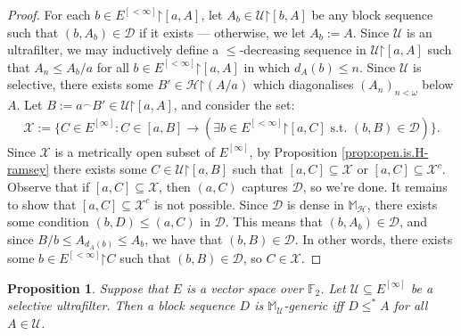 \documentclass[10pt,a4paper]{amsart}
\theoremstyle{plain}
\numberwithin{equation}{section}
\newtheorem{proposition}[theorem]{Proposition}
\theoremstyle{definition}
\newcommand{\cal}{\mathcal}
\newcommand{\restrictedto}{\mathord{\upharpoonright}}
\newcommand{\U}{\cal{U}}
\newcommand{\X}{\cal{X}}
\renewcommand{\H}{\cal{H}}
\newcommand{\D}{\cal{D}}
\begin{document}
\begin{proof}
    For each $b \in E^{[<\infty]}\restrictedto[a,A]$, let $A_b \in \U\restrictedto[b,A]$ be any block sequence such that $(b,A_b)\in \D$ if it exists --- otherwise, we let $A_b := A$. Since $\U$ is an ultrafilter, we may inductively define a $\leq$-decreasing sequence in $\U\restrictedto[a,A]$ such that $A_n \leq A_b/a$ for all $b \in E^{[<\infty]}\restrictedto[a,A]$ in which $d_A(b) \leq n$. Since $\U$ is selective, there exists some $B' \in \H\restrictedto(A/a)$ which diagonalises $(A_n)_{n<\omega}$ below $A$. Let $B := a^\frown B' \in \U\restrictedto[a,A]$, and consider the set:
    \begin{align*}
        \X := \{C \in E^{[\infty]} : C \in [a,B] \to (\exists b \in E^{[<\infty]}\restrictedto[a,C] \text{ s.t. } (b,B) \in \D)\}.
    \end{align*}
    Since $\X$ is a metrically open subset of $E^{[\infty]}$, by Proposition \ref{prop:open.is.H-ramsey} there exists some $C \in \U\restrictedto[a,B]$ such that $[a,C] \subseteq \X$ or $[a,C] \subseteq \X^c$. Observe that if $[a,C] \subseteq \X$, then $(a,C)$ captures $\D$, so we're done. It remains to show that $[a,C] \subseteq \X^c$ is not possible. Since $\D$ is dense in $\mathbb{M}_\H$, there exists some condition $(b,D) \leq (a,C)$ in $\D$. This means that $(b,A_b) \in \D$, and since $B/b \leq A_{d_A(b)} \leq A_b$, we have that $(b,B) \in \D$. In other words, there exists some $b \in E^{[<\infty]}\restrictedto C$ such that $(b,B) \in \D$, so $C \in \X$.
\end{proof}

\begin{proposition}
\label{prop:M-generic.characterisation}
    Suppose that $E$ is a vector space over $\mathbb{F}_2$. Let $\U \subseteq E^{[\infty]}$ be a selective ultrafilter. Then a block sequence $D$ is $\mathbb{M}_\U$-generic iff $D \leq^* A$ for all $A \in \U$.
\end{proposition}
\end{document}
